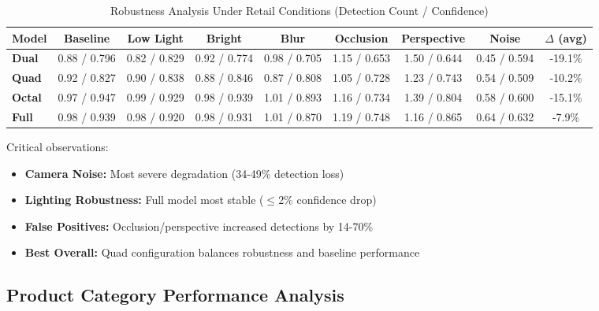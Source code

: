 \documentclass[conference]{IEEEtran}
\begin{document}
\begin{table*}[t]
\centering
\caption{Robustness Analysis Under Retail Conditions (Detection Count / Confidence)}
\begin{tabular}{lcccccccc}
\toprule
\textbf{Model} & \textbf{Baseline} & \textbf{Low Light} & \textbf{Bright} & \textbf{Blur} & \textbf{Occlusion} & \textbf{Perspective} & \textbf{Noise} & \textbf{$\Delta$ (avg)} \\
\midrule
\textbf{Dual} & 0.88 / 0.796 & 0.82 / 0.829 & 0.92 / 0.774 & 0.98 / 0.705 & 1.15 / 0.653 & 1.50 / 0.644 & 0.45 / 0.594 & -19.1\% \\
\textbf{Quad} & 0.92 / 0.827 & 0.90 / 0.838 & 0.88 / 0.846 & 0.87 / 0.808 & 1.05 / 0.728 & 1.23 / 0.743 & 0.54 / 0.509 & -10.2\% \\
\textbf{Octal} & 0.97 / 0.947 & 0.99 / 0.929 & 0.98 / 0.939 & 1.01 / 0.893 & 1.16 / 0.734 & 1.39 / 0.804 & 0.58 / 0.600 & -15.1\% \\
\textbf{Full} & 0.98 / 0.939 & 0.98 / 0.920 & 0.98 / 0.931 & 1.01 / 0.870 & 1.19 / 0.748 & 1.16 / 0.865 & 0.64 / 0.632 & -7.9\% \\
\bottomrule
\end{tabular}
\end{table*}

Critical observations:
\begin{itemize}
    \item \textbf{Camera Noise:} Most severe degradation (34-49\% detection loss)
    \item \textbf{Lighting Robustness:} Full model most stable ($\leq$2\% confidence drop)
    \item \textbf{False Positives:} Occlusion/perspective increased detections by 14-70\%
    \item \textbf{Best Overall:} Quad configuration balances robustness and baseline performance
\end{itemize}

\subsection{Product Category Performance Analysis}
\end{document}
